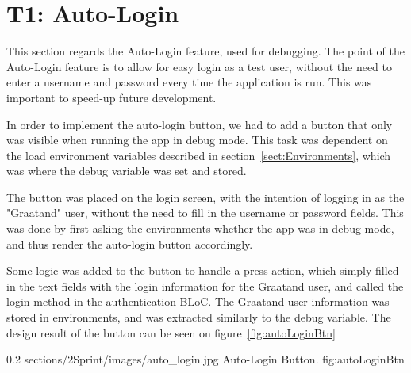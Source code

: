 \section{T1: Auto-Login}
\label{sect:AutoFill}
This section regards the Auto-Login feature, used for debugging. The point of the Auto-Login feature is to allow for easy login as a test user, without the need to enter a username and password every time the application is run. This was important to speed-up future development.

In order to implement the auto-login button, we had to add a button that only was visible when running the app in debug mode. This task was dependent on the load environment variables described in section~\ref{sect:Environments}, which was where the debug variable was set and stored. 

The button was placed on the login screen, with the intention of logging in as the "Graatand" user, without the need to fill in the username or password fields.
This was done by first asking the environments whether the app was in debug mode, and thus render the auto-login button accordingly.

Some logic was added to the button to handle a press action, which simply filled in the text fields with the login information for the Graatand user, and called the login method in the authentication BLoC. The Graatand user information was stored in environments, and was extracted similarly to the debug variable. The design result of the button can be seen on figure~\ref{fig:autoLoginBtn}

        {0.2} %
        {sections/2Sprint/images/auto_login.jpg} %
        {Auto-Login Button.} %
        {fig:autoLoginBtn} %